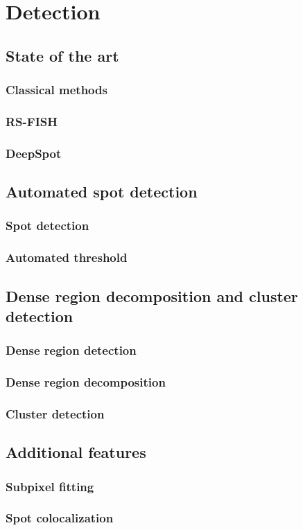 
\graphicspath{{./figures/chapter_2/}}


\chapter{Detection} \label{chap:chapter_2}
\minitoc
\newpage


\section{State of the art}


\subsection{Classical methods}

\subsection{RS-FISH}

\subsection{DeepSpot}


\section{Automated spot detection}


\subsection{Spot detection}

\subsection{Automated threshold}


\section{Dense region decomposition and cluster detection}


\subsection{Dense region detection}

\subsection{Dense region decomposition}

\subsection{Cluster detection}


\section{Additional features}


\subsection{Subpixel fitting}

\subsection{Spot colocalization}
